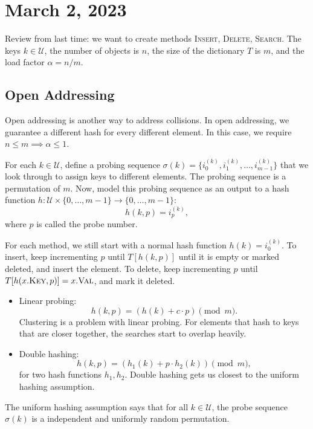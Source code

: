 \section{March 2, 2023}

Review from last time: we want to create methods \textsc{Insert}, \textsc{Delete}, \textsc{Search}. The keys $k\in \mathcal{U}$, the number of objects is $n$, the size of the dictionary $T$ is $m$, and the load factor $\alpha = n/m$.

\subsection{Open Addressing}

Open addressing is another way to address collisions. In open addressing, we guarantee a different hash for every different element. In this case, we require $n\leq m\implies \alpha\leq 1$. 

For each $k\in \mathcal{U}$, define a \ac{probing sequence} $\sigma(k)=\{i_0^{(k)}, i_1^{(k)}, \hdots, i_{m-1}^{(k)}\}$ that we look through to assign keys to different elements. The probing sequence is a permutation of $m$. Now, model this probing sequence as an output to a hash function $h: \mathcal{U} \times \{0,\hdots, m-1\}\rightarrow \{0,\hdots, m-1\}$:
\[h(k,p)=i_p^{(k)},\]
where $p$ is called the \ac{probe number}. 

For each method, we still start with a normal hash function $h(k)=i_0^{(k)}$. To insert, keep incrementing $p$ until $T[h(k,p)]$ until it is empty or marked deleted, and insert the element. To delete, keep incrementing $p$ until $T[h(x.\textsc{Key},p)]=x.\textsc{Val}$, and mark it deleted. 

\begin{itemize}
    \item Linear probing: 
    \[h(k,p) = (h(k)+c\cdot p)\pmod{m}.\]
    Clustering is a problem with linear probing. For elements that hash to keys that are closer together, the searches start to overlap heavily. 
    \item Double hashing: 
    \[h(k,p) = (h_1(k) + p\cdot h_2(k))\pmod{m},\]
    for two hash functions $h_1,h_2$. Double hashing gets us closest to the uniform hashing assumption.
\end{itemize}

\begin{definition}

The \ac{uniform hashing assumption} says that for all $k\in \mathcal{U}$, the probe sequence $\sigma(k)$ is a independent and uniformly random permutation.
\end{definition}

